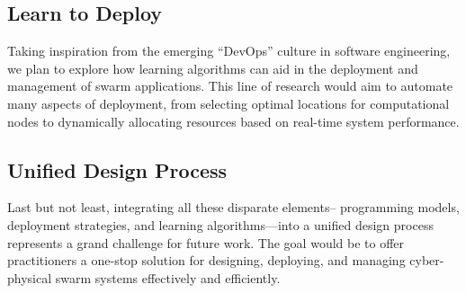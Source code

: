 \subsection*{Learn to Deploy}
Taking inspiration from the emerging ``DevOps'' culture in software engineering, 
 we plan to explore how learning algorithms can aid in the deployment and management of swarm applications. 
 This line of research would aim to automate many aspects of deployment, 
 from selecting optimal locations for computational nodes to dynamically allocating resources based on real-time system performance.

\subsection*{Unified Design Process}
Last but not least, 
 integrating all these disparate elements--
 programming models, deployment strategies, and learning algorithms—into a unified design process represents a grand challenge for future work. 
 The goal would be to offer practitioners a one-stop solution for designing, deploying, and managing cyber-physical swarm systems effectively and efficiently.